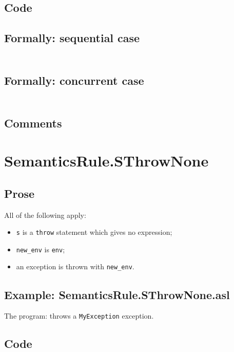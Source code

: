 \documentclass{book}
\begin{document}
  \subsection{Code}

  \subsection{Formally: sequential case}
  \begin{align}
  \end{align} 

  \subsection{Formally: concurrent case}
  \begin{align}
  \end{align} 

    \subsection{Comments}

\section{SemanticsRule.SThrowNone \label{sec:SemanticsRule.SThrowNone}}

    \subsection{Prose}
    All of the following apply:
    \begin{itemize}
    \item \texttt{s} is a \texttt{throw} statement which gives no expression;
    \item \texttt{new\_env} is \texttt{env};
    \item an exception is thrown with \texttt{new\_env}.
    \end{itemize}

    \subsection{Example: SemanticsRule.SThrowNone.asl}
    The program:
    throws a \texttt{MyException} exception.

  \subsection{Code}
\end{document}
